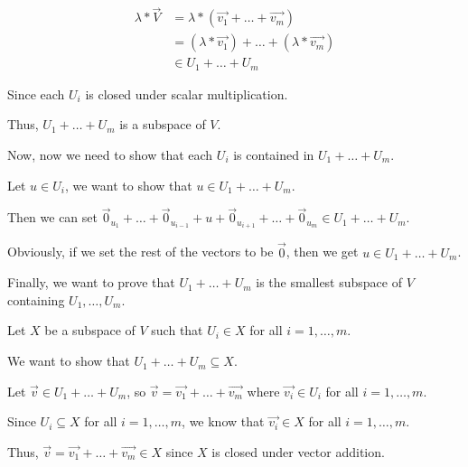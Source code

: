 {{\begin{align*}
	\lambda * \vec{V} & = \lambda * \left( \vec{v_1} + \ldots + \vec{v_{m}} \right)                          \\
	                  & = \left( \lambda * \vec{v_1} \right) + \ldots + \left( \lambda * \vec{v_{m}} \right) \\
	                  & \in U_1 + \ldots + U_{m}
\end{align*}

Since each \(U_{i}\) is closed under scalar multiplication.

Thus, \(U_1 + \ldots + U_{m}\) is a subspace of \(V\).

Now, now we need to show that each \(U_{i}\) is contained in \(U_1 + \ldots + U_{m}\).

Let \(u \in U_{i}\), we want to show that \(u \in U_1 + \ldots + U_{m}\).

Then we can set \(\vec{0}_{u_1} + \ldots + \vec{0}_{u_{i - 1}} + u + \vec{0}_{u_{i + 1}} + \ldots + \vec{0}_{u_{m}} \in U_1 + \ldots + U_{m}\).

Obviously, if we set the rest of the vectors to be \(\vec{0}\), then we get \(u \in U_1 + \ldots + U_{m}\).

Finally, we want to prove that \(U_1 + \ldots + U_{m}\) is the smallest subspace of \(V\) containing \(U_1, \ldots, U_{m}\).

Let \(X\) be a subspace of \(V\) such that \(U_{i} \in X\) for all \(i = 1, \ldots, m\).

We want to show that \(U_1 + \ldots + U_{m} \subseteq X\).

Let \(\vec{v} \in U_1 + \ldots + U_{m}\), so \(\vec{v} = \vec{v_1} + \ldots + \vec{v_{m}}\) where \(\vec{v_{i}} \in U_{i}\) for all \(i = 1, \ldots, m\).

Since \(U_{i} \subseteq X\) for all \(i = 1, \ldots, m\), we know that \(\vec{v_{i}} \in X\) for all \(i = 1, \ldots, m\).

Thus, \(\vec{v} = \vec{v_1} + \ldots + \vec{v_{m}} \in X\) since \(X\) is closed under vector addition.
}
}

